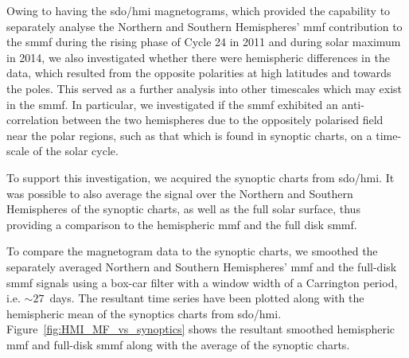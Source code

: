 Owing to having the \gls{sdo/hmi} magnetograms, which provided the capability to separately analyse the Northern and Southern Hemispheres' \gls{mmf} contribution to the \gls{smmf} during the rising phase of Cycle 24 in 2011 and during solar maximum in 2014, we also investigated whether there were hemispheric differences in the data, which resulted from the opposite polarities at high latitudes and towards the poles. This served as a further analysis into other timescales which may exist in the \gls{smmf}. In particular, we investigated if the \gls{smmf} exhibited an anti-correlation between the two hemispheres due to the oppositely polarised field near the polar regions, such as that which is found in synoptic charts, on a time-scale of the solar cycle.

To support this investigation, we acquired the synoptic charts from \gls{sdo/hmi}. It was possible to also average the signal over the Northern and Southern Hemispheres of the synoptic charts, as well as the full solar surface, thus providing a comparison to the hemispheric \gls{mmf} and the full disk \gls{smmf}.

To compare the magnetogram data to the synoptic charts, we smoothed the separately averaged Northern and Southern Hemispheres' \gls{mmf} and the full-disk \gls{smmf} signals using a box-car filter with a window width of a Carrington period, i.e. $\sim 27$~days. The resultant time series have been plotted along with the hemispheric mean of the synoptics charts from \gls{sdo/hmi}. Figure~\ref{fig:HMI_MF_vs_synoptics} shows the resultant smoothed hemispheric \gls{mmf} and full-disk \gls{smmf} along with the average of the synoptic charts.


